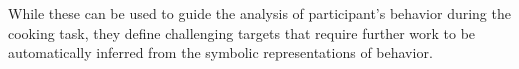 While these can be used to guide the analysis of participant's behavior during the cooking task, they define challenging targets that require further work to be automatically inferred from the symbolic representations of behavior. 








